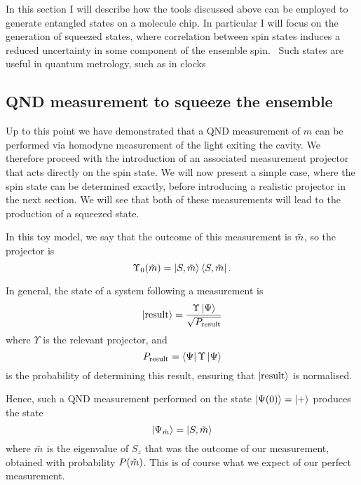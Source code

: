 In this section I will describe how the tools discussed above can be employed
to generate entangled states on a molecule chip. In particular I will focus on
the generation of squeezed states, where correlation between spin states
induces a reduced uncertainty in some component of the ensemble spin.~\cite{}
Such states are useful in quantum metrology, such as in clocks~\cite{} 


\subsection{QND measurement to squeeze the ensemble}
\label{squeeze:QNDsqueeze}

Up to this point we have demonstrated that a QND measurement of $m$ can be
performed via homodyne measurement of the light exiting the cavity. We
therefore proceed with the introduction of an associated measurement projector
that acts directly on the spin state. We will now present a simple case, where
the spin state can be determined exactly, before introducing a realistic
projector in the next section. We will see that both of these measurements will
lead to the production of a squeezed state.

In this toy model, we say that the outcome of this measurement is $\tilde{m}$,
so the projector is
%
\begin{equation}
  \Upsilon_0(\tilde{m}) = \ket{S, \tilde{m}}\bra{S, \tilde{m}}.
\end{equation}

In general, the state of a system following a measurement
is~\cite{gerry_knight_2004}
%
\begin{equation}
  \ket{\text{result}} = \frac{\Upsilon\ket{\Psi}}{\sqrt{P_\text{result}}}
  \label{squeeze:eqn:projresult}
\end{equation}
%
where $\Upsilon$ is the relevant projector, and
%
\begin{equation}
  P_\text{result} = \bra{\Psi}\Upsilon\ket{\Psi}
\end{equation}
%
is the probability of determining this result, ensuring that
$\ket{\text{result}}$ is normalised.

Hence, such a QND measurement performed on the state $\ket{\Psi(0)} =
\ket{+}$ produces the state
%
\begin{equation}
  \ket{\Psi_{\tilde{m}}} = \ket{S, \tilde{m}}
\end{equation}
%
where $\tilde{m}$ is the eigenvalue of $S_z$ that was the outcome of our
measurement, obtained with probability $P(\tilde{m})$. This is of course what we
expect of our perfect measurement.

